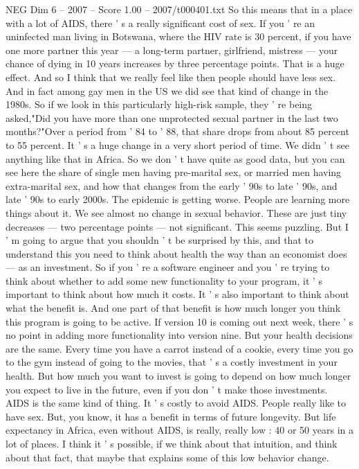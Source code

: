 \begin{textsample}{NEG Dim 6 – 2007 – Score 1.00 – 2007/t000401.txt}
So this means that in a place with a lot of AIDS, there ' s a really significant cost of sex.
If you ' re an uninfected man living in Botswana, where the HIV rate is 30 percent, if you have one more partner this year — a long-term partner, girlfriend, mistress — your chance of dying in 10 years increases by three percentage points.
That is a huge effect.
And so I think that we really feel like then people should have less sex.
And in fact among gay men in the US we did see that kind of change in the 1980s.
So if we look in this particularly high-risk sample, they ' re being asked,"Did you have more than one unprotected sexual partner in the last two months?"Over a period from ' 84 to ' 88, that share drops from about 85 percent to 55 percent.
It ' s a huge change in a very short period of time.
We didn ' t see anything like that in Africa.
So we don ' t have quite as good data, but you can see here the share of single men having pre-marital sex, or married men having extra-marital sex, and how that changes from the early ' 90s to late ' 90s, and late ' 90s to early 2000s.
The epidemic is getting worse.
People are learning more things about it.
We see almost no change in sexual behavior.
These are just tiny decreases — two percentage points — not significant.
This seems puzzling.
But I ' m going to argue that you shouldn ' t be surprised by this, and that to understand this you need to think about health the way than an economist does — as an investment.
So if you ' re a software engineer and you ' re trying to think about whether to add some new functionality to your program, it ' s important to think about how much it costs.
It ' s also important to think about what the benefit is.
And one part of that benefit is how much longer you think this program is going to be active.
If version 10 is coming out next week, there ' s no point in adding more functionality into version nine.
But your health decisions are the same.
Every time you have a carrot instead of a cookie, every time you go to the gym instead of going to the movies, that ' s a costly investment in your health.
But how much you want to invest is going to depend on how much longer you expect to live in the future, even if you don ' t make those investments.
AIDS is the same kind of thing.
It ' s costly to avoid AIDS.
People really like to have sex.
But, you know, it has a benefit in terms of future longevity.
But life expectancy in Africa, even without AIDS, is really, really low : 40 or 50 years in a lot of places.
I think it ' s possible, if we think about that intuition, and think about that fact, that maybe that explains some of this low behavior change.

\end{textsample}
